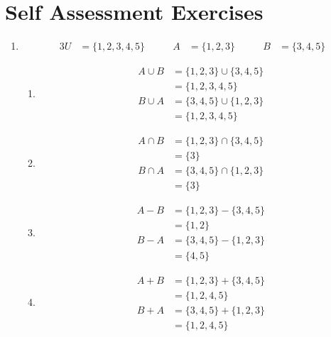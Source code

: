 \documentclass[../notes.tex]{subfiles}
\begin{document}
    \section{Self Assessment Exercises}
      \begin{enumerate}
        \item 
          \begin{alignat*}{3}
            U &= \{1, 2, 3, 4, 5\} \qquad & A &= \{1, 2, 3\} \qquad & B &= \{3, 4, 5\}
          \end{alignat*}
          \begin{enumerate}[label=(\alph*)]
            \item 
              \begin{align*}
                A \cup B &= \{1, 2, 3\} \cup \{3, 4, 5\}\\
                &= \{1, 2, 3, 4, 5\}\\
                B \cup A &= \{3, 4, 5\} \cup \{1, 2, 3\}\\
                &= \{1, 2, 3, 4, 5\}
              \end{align*}
            \item
              \begin{align*}
                A \cap B &= \{1, 2, 3\} \cap \{3, 4, 5\}\\
                &= \{3\}\\
                B \cap A &= \{3, 4, 5\} \cap \{1, 2, 3\}\\
                &= \{3\}
              \end{align*}
            \item
              \begin{align*}
                A - B &= \{1, 2, 3\} - \{3, 4, 5\}\\
                &= \{1, 2\}\\
                B - A &= \{3, 4, 5\} - \{1, 2, 3\}\\
                &= \{4, 5\}
              \end{align*}
            \item
              \begin{align*}
                A + B &= \{1, 2, 3\} + \{3, 4, 5\}\\
                &= \{1, 2, 4 , 5\}\\
                B + A &= \{3, 4, 5\} + \{1, 2, 3\}\\
                &= \{1, 2, 4, 5\}
              \end{align*}
          \end{enumerate}

\end{enumerate}
\end{document}
